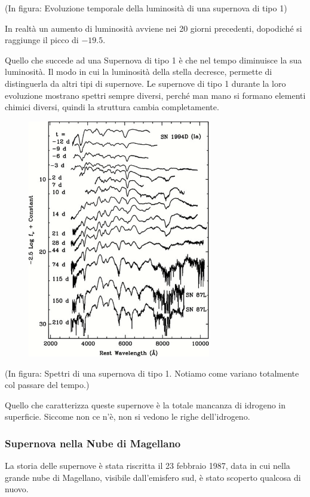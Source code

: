 (In figura: Evoluzione temporale della luminosità di una supernova di tipo 1)

In realtà un aumento di luminosità avviene nei 20 giorni precedenti, dopodiché si raggiunge il picco di $-19.5$.

Quello che succede ad una Supernova di tipo 1 è che nel tempo diminuisce la sua luminosità. Il modo in cui la luminosità della stella decresce, permette di distinguerla da altri tipi di supernove. Le supernove di tipo 1 durante la loro evoluzione mostrano spettri sempre diversi, perché man mano si formano elementi chimici diversi, quindi la struttura cambia completamente.

\begin{figure}[H]
    \centering
    \includegraphics[width=8cm]{lezione 28 novembre/spettrisupernova.png}
    \label{lezione 28 novembre/spettrisupernova.png}
\end{figure}

(In figura: Spettri di una supernova di tipo 1. Notiamo come variano totalmente col passare del tempo.)

Quello che caratterizza queste supernove è la totale mancanza di idrogeno in superficie. Siccome non ce n'è, non si vedono le righe dell'idrogeno.

\subsubsection{Supernova nella Nube di Magellano}
La storia delle supernove è stata riscritta il 23 febbraio 1987, data in cui nella grande nube di Magellano, visibile dall'emisfero sud, è stato scoperto qualcosa di nuovo.

